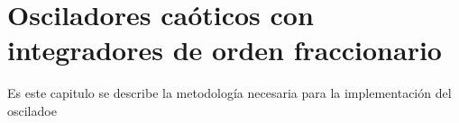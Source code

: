 \chapter{Osciladores caóticos con integradores de orden fraccionario}

	Es este capitulo se describe la metodología necesaria para la implementación del osciladoe